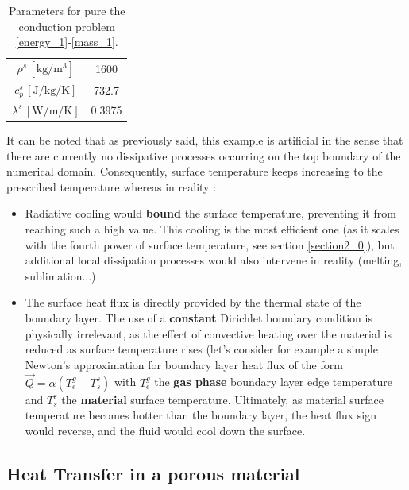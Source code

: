\documentclass[english,10pt,a4paper,oneside,twocolumn,titlepage]{report}
\begin{document}
	\begin{table}[h]
	\centering
	\begin{tabular}{|c|c|}
	\hline
	$\rho^s \, \left[\text{kg}/\text{m}^3 \right]$ & 1600 \\ 
	$c_p^s \, \left[\text{J}/\text{kg}/\text{K} \right]$ &
	 732.7  \\ 
	 $\lambda^s \, \left[\text{W}/\text{m}/\text{K} \right]$ 
	 & 0.3975  \\ 
	\hline
	\end{tabular}
	\caption{\label{table1_1} Parameters for pure the
	conduction problem \eqref{energy_1}-\eqref{mass_1}.}
	\end{table}
	
	 It can be noted that
	 as previously said, this example is artificial in the sense
	 that there are currently no dissipative processes 
	 occurring on the top boundary of the numerical
	 domain. Consequently, surface temperature 
	 keeps increasing to the prescribed temperature
	 whereas in reality :
	 \begin{itemize}
	 \item Radiative cooling would \textbf{bound}
	  the surface 
	 temperature, preventing it from reaching such a high 
	 value. This cooling is the most efficient one (as it scales
	 with the fourth power of surface temperature, see 
	 section \ref{section2_0}), but additional local dissipation
	 processes would also intervene in reality (melting,
	  sublimation...)
	  \item The surface heat flux is directly provided by the 
	  thermal state of the boundary layer. The use of a 
	  \textbf{constant} Dirichlet boundary condition
	   is physically irrelevant, as the effect of
	  convective heating over the material is reduced as 
	  surface temperature rises (let's consider for example
	  a simple Newton's approximation for boundary layer
	  heat flux of the form $ \overrightarrow{Q}
	   = \alpha \left(T^g_{e} - T^s_{s} \right) $ 
	   with $T^g_{e} $ the \textbf{gas
	  phase} boundary layer edge temperature and $T^s_{s}
	  $ the \textbf{material} surface temperature. Ultimately, 
	  as material surface temperature becomes hotter than
	  the boundary layer, the heat flux sign would reverse, 
	  and the fluid would cool down the surface.
	 \end{itemize} 
	 
	 \subsection{Heat Transfer in a porous material}
	 \label{section1_2}
	 
\end{document}
